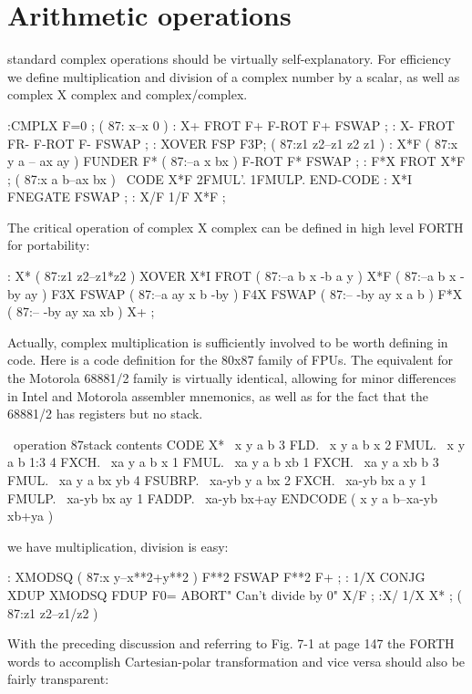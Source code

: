 \section{Arithmetic operations}
 standard complex operations should be virtually self-explanatory. For efficiency we define multiplication and division of a complex number by a scalar, as well as complex X complex and complex/complex.

:CMPLX F=0 ;     ( 87: x--x 0 )
: X+ FROT F+  F-ROT F+ FSWAP ;
: X- FROT FR- F-ROT F- FSWAP ;
: XOVER FSP F3P; ( 87:z1 z2--z1 z2 z1 )
: X*F            ( 87:x y a -- ax ay )
    FUNDER F*    ( 87:--a x bx )
    F-ROT  F* FSWAP ;
: F*X FROT X*F ; ( 87:x a b--ax bx )
\ CODE X*F 2FMUL'. 1FMULP. END-CODE
: X*I FNEGATE FSWAP ;
: X/F 1/F X*F ;

The critical operation of complex X complex can be defined in high level FORTH for portability:

: X*                ( 87:z1 z2--z1*z2 )
    XOVER X*I FROT  ( 87:--a b x -b a y )
    X*F             ( 87:--a b x -by ay )
    F3X FSWAP       ( 87:--a ay x b -by )
    F4X FSWAP       ( 87:-- -by ay x a b )
    F*X             ( 87:-- -by ay xa xb )
    X+ ;

Actually, complex multiplication is sufficiently involved to be worth defining in code. Here is a code definition for the 80x87 family of FPUs. The equivalent for the Motorola 68881/2 family is virtually identical, allowing for minor differences in Intel and Motorola assembler mnemonics, as well as for the fact that the 68881/2 has registers but no stack.

\ operation     87stack contents
CODE X*         \ x  y a b
    3 FLD.      \ x  y a b x
    2 FMUL.     \ x  y a b 1:3
    4 FXCH.     \ xa y a b x
    1 FMUL.     \ xa y a b xb
    1 FXCH.     \ xa y a xb b
    3 FMUL.     \ xa y a bx yb
    4 FSUBRP.   \ xa-yb y a bx
    2 FXCH.     \ xa-yb bx a y
    1 FMULP.    \ xa-yb bx ay
    1 FADDP.    \ xa-yb bx+ay
ENDCODE ( x y a b--xa-yb xb+ya )

 we have multiplication, division is easy:

: XMODSQ            ( 87:x y--x**2+y**2 )
    F**2 FSWAP F**2 F+ ;
: 1/X CONJG XDUP XMODSQ
    FDUP F0= ABORT" Can't divide by 0" X/F ;
:X/ 1/X X* ;        ( 87:z1 z2--z1/z2 )

With the preceding discussion and referring to Fig. 7-1 at page 147 the FORTH words to accomplish Cartesian-polar transformation and vice versa should also be fairly transparent:

